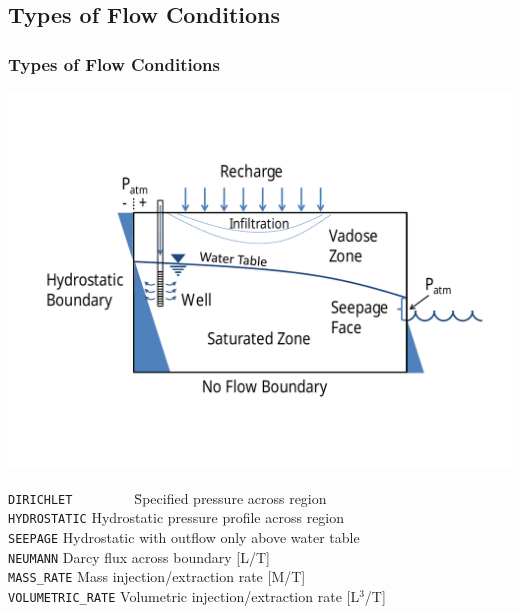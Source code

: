 \subsection{Types of Flow Conditions}

\begin{frame}\frametitle{Types of Flow Conditions}

\vspace{0.1in}
\centering
\includegraphics[width=0.9\linewidth]{./flow_bcs_with_well}
\small 
\begin{tabbing}
\verb|DIRICHLET        |	\= Specified pressure across region\\
\verb|HYDROSTATIC|	      \> Hydrostatic pressure profile across region\\
\verb|SEEPAGE|	         	\> Hydrostatic with outflow only above water table\\
\verb|NEUMANN|			      \> Darcy flux across boundary [L/T]\\
\verb|MASS_RATE|	      	\> Mass injection/extraction rate [M/T]\\
\verb|VOLUMETRIC_RATE|	  \> Volumetric injection/extraction rate [L$^3$/T]\\
\end{tabbing}

\end{frame}

